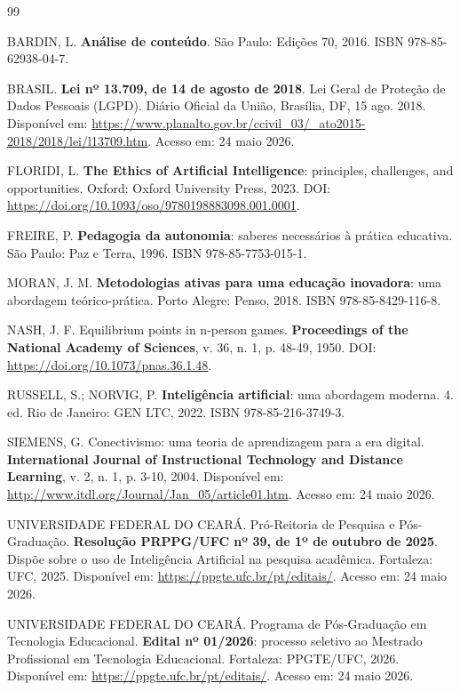 \documentclass[12pt,a4paper]{article}
\begin{document}
\begin{thebibliography}{99}

 BARDIN, L. \textbf{Análise de conteúdo}. São Paulo: Edições 70, 2016. ISBN 978-85-62938-04-7.

 BRASIL. \textbf{Lei nº 13.709, de 14 de agosto de 2018}. Lei Geral de Proteção de Dados Pessoais (LGPD). Diário Oficial da União, Brasília, DF, 15 ago. 2018. Disponível em: \url{https://www.planalto.gov.br/ccivil_03/_ato2015-2018/2018/lei/l13709.htm}. Acesso em: 24 maio 2026.

 FLORIDI, L. \textbf{The Ethics of Artificial Intelligence}: principles, challenges, and opportunities. Oxford: Oxford University Press, 2023. DOI: \url{https://doi.org/10.1093/oso/9780198883098.001.0001}.

 FREIRE, P. \textbf{Pedagogia da autonomia}: saberes necessários à prática educativa. São Paulo: Paz e Terra, 1996. ISBN 978-85-7753-015-1.

 MORAN, J. M. \textbf{Metodologias ativas para uma educação inovadora}: uma abordagem teórico-prática. Porto Alegre: Penso, 2018. ISBN 978-85-8429-116-8.

 NASH, J. F. Equilibrium points in n-person games. \textbf{Proceedings of the National Academy of Sciences}, v. 36, n. 1, p. 48-49, 1950. DOI: \url{https://doi.org/10.1073/pnas.36.1.48}.

 RUSSELL, S.; NORVIG, P. \textbf{Inteligência artificial}: uma abordagem moderna. 4. ed. Rio de Janeiro: GEN LTC, 2022. ISBN 978-85-216-3749-3.

 SIEMENS, G. Conectivismo: uma teoria de aprendizagem para a era digital. \textbf{International Journal of Instructional Technology and Distance Learning}, v. 2, n. 1, p. 3-10, 2004. Disponível em: \url{http://www.itdl.org/Journal/Jan_05/article01.htm}. Acesso em: 24 maio 2026.

 UNIVERSIDADE FEDERAL DO CEARÁ. Pró-Reitoria de Pesquisa e Pós-Graduação. \textbf{Resolução PRPPG/UFC nº 39, de 1º de outubro de 2025}. Dispõe sobre o uso de Inteligência Artificial na pesquisa acadêmica. Fortaleza: UFC, 2025. Disponível em: \url{https://ppgte.ufc.br/pt/editais/}. Acesso em: 24 maio 2026.

 UNIVERSIDADE FEDERAL DO CEARÁ. Programa de Pós-Graduação em Tecnologia Educacional. \textbf{Edital nº 01/2026}: processo seletivo ao Mestrado Profissional em Tecnologia Educacional. Fortaleza: PPGTE/UFC, 2026. Disponível em: \url{https://ppgte.ufc.br/pt/editais/}. Acesso em: 24 maio 2026.


\end{thebibliography}
\end{document}
